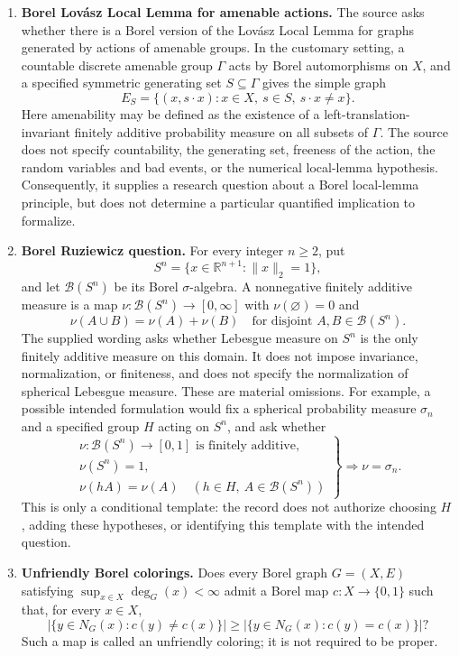 \documentclass[11pt]{article}
\newcommand{\R}{\mathbb{R}}
\begin{document}
\begin{enumerate}
\item \textbf{Borel Lov\'asz Local Lemma for amenable actions.} The source asks whether there is a Borel version of the Lov\'asz Local Lemma for graphs generated by actions of amenable groups. In the customary setting, a countable discrete amenable group \(\Gamma\) acts by Borel automorphisms on \(X\), and a specified symmetric generating set \(S\subseteq\Gamma\) gives the simple graph
\[
E_S=\{(x,s\cdot x):x\in X,\ s\in S,\ s\cdot x\ne x\}.
\]
Here amenability may be defined as the existence of a left-translation-invariant finitely additive probability measure on all subsets of \(\Gamma\). The source does not specify countability, the generating set, freeness of the action, the random variables and bad events, or the numerical local-lemma hypothesis. Consequently, it supplies a research question about a Borel local-lemma principle, but does not determine a particular quantified implication to formalize.

\item \textbf{Borel Ruziewicz question.} For every integer \(n\geq2\), put
\[
S^n=\{x\in\R^{n+1}:\|x\|_2=1\},
\]
and let \(\mathcal B(S^n)\) be its Borel \(\sigma\)-algebra. A nonnegative finitely additive measure is a map \(\nu:\mathcal B(S^n)\to[0,\infty]\) with \(\nu(\varnothing)=0\) and
\[
\nu(A\cup B)=\nu(A)+\nu(B)
\quad\text{for disjoint }A,B\in\mathcal B(S^n).
\]
The supplied wording asks whether Lebesgue measure on \(S^n\) is the only finitely additive measure on this domain. It does not impose invariance, normalization, or finiteness, and does not specify the normalization of spherical Lebesgue measure. These are material omissions. For example, a possible intended formulation would fix a spherical probability measure \(\sigma_n\) and a specified group \(H\) acting on \(S^n\), and ask whether
\[
\left.
\begin{gathered}
\nu:\mathcal B(S^n)\to[0,1]\text{ is finitely additive},\\
\nu(S^n)=1,\\
\nu(hA)=\nu(A)\quad(h\in H,\ A\in\mathcal B(S^n))
\end{gathered}
\right\}
\Longrightarrow \nu=\sigma_n.
\]
This is only a conditional template: the record does not authorize choosing \(H\), adding these hypotheses, or identifying this template with the intended question.

\item \textbf{Unfriendly Borel colorings.} Does every Borel graph \(G=(X,E)\) satisfying \(\sup_{x\in X}\deg_G(x)<\infty\) admit a Borel map \(c:X\to\{0,1\}\) such that, for every \(x\in X\),
\[
\bigl|\{y\in N_G(x):c(y)\ne c(x)\}\bigr|
\geq
\bigl|\{y\in N_G(x):c(y)=c(x)\}\bigr|?
\]
Such a map is called an unfriendly coloring; it is not required to be proper.


\end{enumerate}
\end{document}
